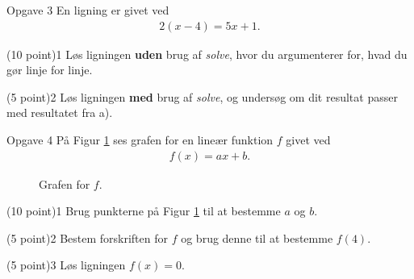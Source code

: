\begin{opgavetekst}{Opgave 3}
	En ligning er givet ved
	\begin{align*}
		2(x-4) = 5x+1.
	\end{align*}
\end{opgavetekst}
\begin{delopgave}{(10 point)}{1}
	Løs ligningen \textbf{uden} brug af \textit{solve}, hvor du argumenterer for, hvad du gør linje for linje.
\end{delopgave}
\begin{delopgave}{(5 point)}{2}
	Løs ligningen \textbf{med} brug af \textit{solve}, og undersøg om dit resultat passer med resultatet fra a).
\end{delopgave}

\begin{opgavetekst}{Opgave 4}
	På Figur \ref{fig:oneline} ses grafen for en lineær funktion $f$ givet ved
	\begin{align*}
		f(x) = ax + b.
	\end{align*}
	\begin{figure}[H]
		\centering
		\caption{Grafen for $f$.}
		\label{fig:oneline}
	\end{figure}\phantom{h}
\end{opgavetekst}
\begin{delopgave}{(10 point)}{1}
	Brug punkterne på Figur \ref{fig:oneline} til at bestemme $a$ og $b$. 
\end{delopgave}
\begin{delopgave}{(5 point)}{2}
	Bestem forskriften for $f$ og brug denne til at bestemme $f(4)$. 
\end{delopgave}
\begin{delopgave}{(5 point)}{3}
	Løs ligningen $f(x) = 0$.
\end{delopgave}

